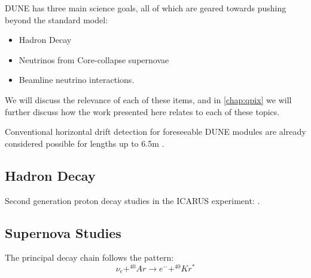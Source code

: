 DUNE has three main science goals, all of which are geared towards pushing beyond the standard model:
\begin{itemize}
    \item Hadron Decay
    \item Neutrinos from Core-collapse supernovae
    \item Beamline neutrino interactions.
\end{itemize}

We will discuss the relevance of each of these items, and in \ref{chap:qpix} we will further discuss how the work presented here relates to each of these topics. 


Conventional horizontal drift detection for foreseeable DUNE modules are already considered possible for lengths up to 6.5m \citep{DUNE_Vertical:Paulucci_2022}.


\subsection{Hadron Decay}
\label{sect:intro_decay}

Second generation proton decay studies in the ICARUS experiment: \citep{ICARUS_2001}.


\subsection{Supernova Studies}
\label{sect:intro_supernova}

The principal decay chain follows the pattern:
\begin{equation}
    \nu_{e} + ^{40}Ar \rightarrow e^- + ^{40}Kr^*
\end{equation}


